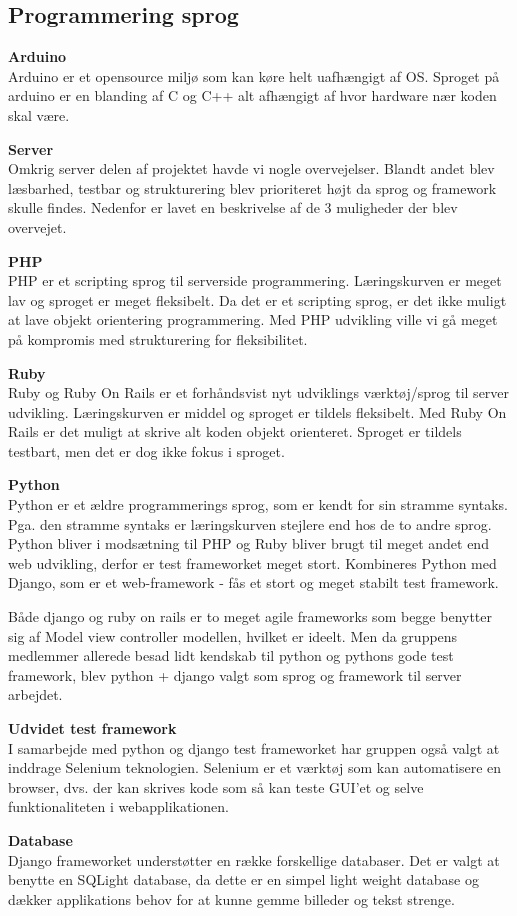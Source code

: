 \subsection*{Programmering sprog}

\textbf{{\LARGE Arduino}} \\
Arduino er et opensource miljø som kan køre helt uafhængigt af OS. Sproget på arduino er en blanding af C og C++ alt afhængigt af hvor hardware nær koden skal være. \newline

\textbf{{\LARGE Server}} \\
Omkrig server delen af projektet havde vi nogle overvejelser. Blandt andet blev læsbarhed, testbar og strukturering blev prioriteret højt da sprog og framework skulle findes. Nedenfor er lavet en beskrivelse af de 3 muligheder der blev overvejet. \newline

\textbf{PHP}\\
PHP er et scripting sprog til serverside programmering. Læringskurven er meget lav og sproget er meget fleksibelt. Da det er et scripting sprog, er det ikke muligt at lave objekt orientering programmering. Med PHP udvikling ville vi gå meget på kompromis med strukturering for fleksibilitet. 

\textbf{Ruby} \\
Ruby og Ruby On Rails er et forhåndsvist nyt udviklings værktøj/sprog til server udvikling. Læringskurven er middel og sproget er tildels fleksibelt. Med Ruby On Rails er det muligt at skrive alt koden objekt orienteret. Sproget er tildels testbart, men det er dog ikke fokus i sproget. 

\textbf{Python} \\
Python er et ældre programmerings sprog, som er kendt for sin stramme syntaks. Pga. den stramme syntaks er læringskurven stejlere end hos de to andre sprog.
Python bliver i modsætning til PHP og Ruby bliver brugt til meget andet end web udvikling, derfor er test frameworket meget stort. Kombineres Python med Django, som er et web-framework - fås et stort og meget stabilt test framework. \newline

Både django og ruby on rails er to meget agile frameworks som begge benytter sig af Model view controller modellen, hvilket er ideelt. Men da gruppens medlemmer allerede besad lidt kendskab til python og pythons gode test framework, blev python + django valgt som sprog og framework til server arbejdet.

\newpage

\textbf{Udvidet test framework} \\
I samarbejde med python og django test frameworket har gruppen også valgt at inddrage Selenium teknologien. Selenium er et værktøj som kan automatisere en browser, dvs. der kan skrives kode som så kan teste GUI'et og selve funktionaliteten i webapplikationen. 

\textbf{Database}\\
Django frameworket understøtter en række forskellige databaser. Det er valgt at benytte en SQLight database, da dette er en simpel light weight database og dækker applikations behov for at kunne gemme billeder og tekst strenge. 